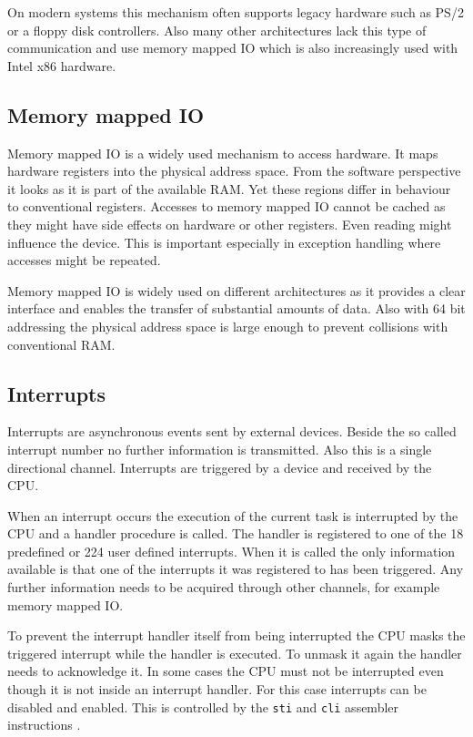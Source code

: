 \documentclass[
a4paper,
11pt,
twoside
]{report}
\begin{document}
		On modern systems this mechanism often supports legacy hardware such as PS/2 or a floppy disk controllers.
		Also many other architectures lack this type of communication and use memory mapped IO which is also increasingly used with Intel x86 hardware.
		\citep{ioports} \citep{intelmanual}
		
		\subsection{Memory mapped IO}
		
		Memory mapped IO is a widely used mechanism to access hardware.
		It maps hardware registers into the physical address space.
		From the software perspective it looks as it is part of the available RAM.
		Yet these regions differ in behaviour to conventional registers.
		Accesses to memory mapped IO cannot be cached as they might have side effects on hardware or other registers.
		Even reading might influence the device.
		This is important especially in exception handling where accesses might be repeated.
		
		Memory mapped IO is widely used on different architectures as it provides a clear interface and enables the transfer of substantial amounts of data.
		Also with 64 bit addressing the physical address space is large enough to prevent collisions with conventional RAM.
		\citep{intelmanual}
		
		\subsection{Interrupts}
		
		Interrupts are asynchronous events sent by external devices.
		Beside the so called interrupt number no further information is transmitted.
		Also this is a single directional channel.
		Interrupts are triggered by a device and received by the CPU.
		
		When an interrupt occurs the execution of the current task is interrupted by the CPU and a handler procedure is called.
		The handler is registered to one of the 18 predefined or 224 user defined interrupts.
		When it is called the only information available is that one of the interrupts it was registered to has been triggered.
		Any further information needs to be acquired through other channels, for example memory mapped IO.
		\citep{intelmanual}
		
		To prevent the interrupt handler itself from being interrupted the CPU masks the triggered interrupt while the handler is executed.
		To unmask it again the handler needs to acknowledge it.
		In some cases the CPU must not be interrupted even though it is not inside an interrupt handler.
		For this case interrupts can be disabled and enabled.
		This is controlled by the \texttt{sti} and \texttt{cli} assembler instructions \citep{intelmanual}.
		
\end{document}
